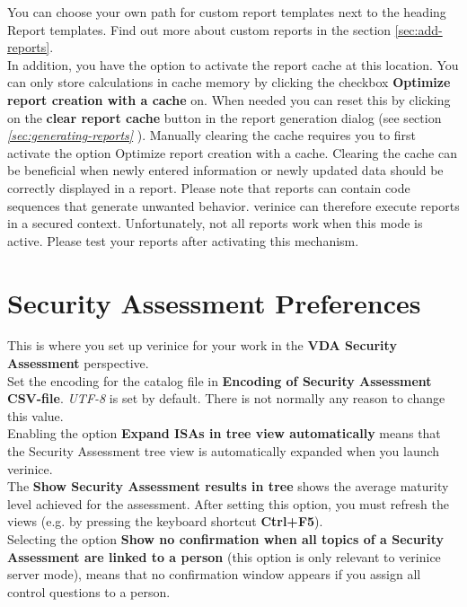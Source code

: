 \documentclass[a4paper,10pt]{book}
\begin{document}
You can choose your own path for custom report templates next to the
heading Report templates. Find out more about custom reports in the
section \ref{sec:add-reports}.\\

In addition, you have the option to activate the report cache at this location.
You can only store calculations in cache memory by clicking the checkbox
\textbf{Optimize report creation with a cache} on. When needed you can reset
this by clicking on the \textbf{clear report cache } button in the report
generation dialog (see section {\em \ref{sec:generating-reports}
}). Manually clearing the cache requires you to
first activate the option Optimize report creation with a cache. Clearing the
cache can be beneficial when newly entered information or newly updated data
should be correctly displayed in a report.
\newline
\newline
Please note that reports can contain code sequences that generate unwanted behavior. verinice can therefore execute reports in a secured context. Unfortunately, not all reports work when this mode is active. Please test your reports after activating this mechanism.

\section{Security Assessment Preferences}
This is where you set up verinice for your work in the \textbf{VDA Security Assessment} perspective.
\newline\\
Set the encoding for the catalog file in \textbf{Encoding of Security Assessment CSV-file}.
{\em UTF-8} is set by default. There is not normally any reason to change this value.
\newline\\
Enabling the option \textbf{Expand ISAs in tree view automatically} means that the Security Assessment
tree view is automatically expanded when you launch verinice.
\newline\\
The \textbf{Show Security Assessment results in tree} shows the average maturity level achieved for the assessment. After setting this option,
you must refresh the views (e.g. by pressing the keyboard shortcut \textbf{Ctrl+F5}).
\newline\\
Selecting the option \textbf{Show no confirmation when all topics of a Security Assessment are linked to a person}
(this option is only relevant to verinice server mode), means that no confirmation window appears if you assign all
control questions to a person.
\end{document}
